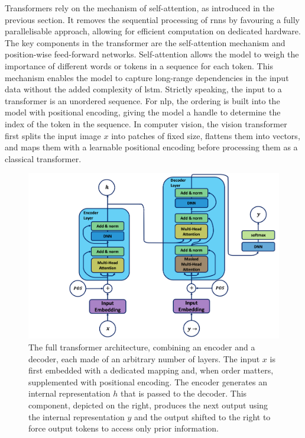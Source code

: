 Transformers rely on the mechanism of self-attention, as introduced in the previous section. It removes the sequential processing of \glspl{rnn} by favouring a fully parallelisable approach, allowing for efficient computation on dedicated hardware. The key components in the transformer are the self-attention mechanism and position-wise feed-forward networks. Self-attention allows the model to weigh the importance of different words or tokens in a sequence for each token. This mechanism enables the model to capture long-range dependencies in the input data without the added complexity of \gls{lstm}. Strictly speaking, the input to a transformer is an unordered sequence. For \gls{nlp}, the ordering is built into the model with positional encoding, giving the model a handle to determine the index of the token in the sequence. In computer vision, the vision transformer first splits the input image $x$ into patches of fixed size, flattens them into vectors, and maps them with a learnable positional encoding before processing them as a classical transformer.

\begin{figure}[h!]
    \center
    \includegraphics[width=\textwidth]{Images/ML/transformer.png}
    \caption{The full transformer architecture, combining an encoder and a decoder, each made of an arbitrary number of layers. The input $x$ is first embedded with a dedicated mapping and, when order matters, supplemented with positional encoding. The encoder generates an internal representation $h$ that is passed to the decoder. This component, depicted on the right, produces the next output using the internal representation $y$ and the output shifted to the right to force output tokens to access only prior information.} 
    \label{fig:tranfoArchi}
\end{figure}

